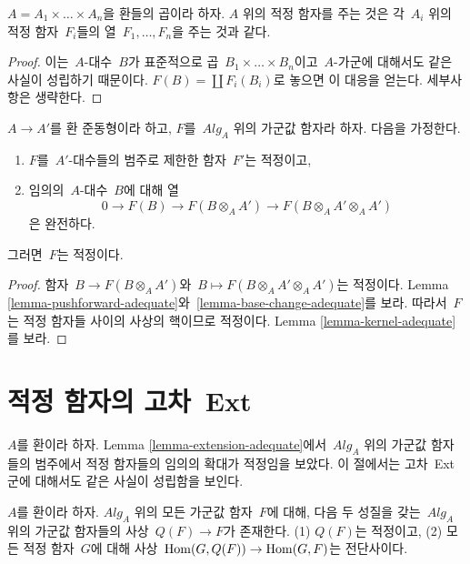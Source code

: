 \begin{lemma}
\label{lemma-adequate-product}
$A = A_1 \times \ldots \times A_n$을 환들의 곱이라 하자.
$A$ 위의 적정 함자를 주는 것은 각\  $A_i$ 위의 적정 함자\  $F_i$들의 열\ 
$F_1, \ldots, F_n$을 주는 것과 같다.
\end{lemma}

\begin{proof}
이는\  $A$-대수\  $B$가 표준적으로 곱\  $B_1 \times \ldots \times B_n$이고\ 
$A$-가군에 대해서도 같은 사실이 성립하기 때문이다.
$F(B) = \coprod F_i(B_i)$로 놓으면 이 대응을 얻는다.
세부사항은 생략한다.
\end{proof}

\begin{lemma}
\label{lemma-adequate-descent}
$A \to A'$를 환 준동형이라 하고, $F$를\  $\textit{Alg}_A$ 위의
가군값 함자라 하자. 다음을 가정한다.
\begin{enumerate}
\item $F$를\  $A'$-대수들의 범주로 제한한 함자\  $F'$는 적정이고,
\item 임의의\  $A$-대수\  $B$에 대해 열
$$
0 \to F(B) \to F(B \otimes_A A') \to F(B \otimes_A A' \otimes_A A')
$$
은 완전하다.
\end{enumerate}
그러면\  $F$는 적정이다.
\end{lemma}

\begin{proof}
함자\  $B \to F(B \otimes_A A')$와\ 
$B \mapsto F(B \otimes_A A' \otimes_A A')$는 적정이다. Lemma
\ref{lemma-pushforward-adequate}와\ 
\ref{lemma-base-change-adequate}를 보라.
따라서\  $F$는 적정 함자들 사이의 사상의 핵이므로 적정이다. Lemma
\ref{lemma-kernel-adequate}를 보라.
\end{proof}


\section{적정 함자의 고차\  Ext}
\label{section-higher-ext}

\noindent
$A$를 환이라 하자. Lemma \ref{lemma-extension-adequate}에서\ 
$\textit{Alg}_A$ 위의 가군값 함자들의 범주에서 적정 함자들의
임의의 확대가 적정임을 보았다. 이 절에서는 고차\  Ext 군에 대해서도
같은 사실이 성립함을 보인다.

\begin{lemma}
\label{lemma-adjoint}
$A$를 환이라 하자. $\textit{Alg}_A$ 위의 모든 가군값 함자\  $F$에
대해, 다음 두 성질을 갖는\  $\textit{Alg}_A$ 위의 가군값 함자들의
사상\  $Q(F) \to F$가
존재한다. (1) $Q(F)$는 적정이고, (2) 모든 적정 함자\  $G$에 대해
사상\  $\mathop{\mathrm{Hom}}\nolimits(G, Q(F)) \to \mathop{\mathrm{Hom}}\nolimits(G, F)$는 전단사이다.
\end{lemma}

